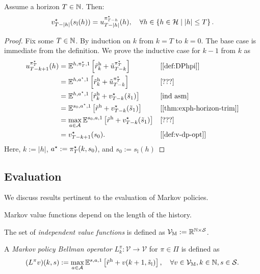 \begin{theorem}
Assume a horizon $T\in \mathbb{N}$. Then:
\[
  v^{\star}_{T-|h|}(s_{\mathrm{l}}(h)) = u^{\pi^{\star}_{T-h}}_{T-|h|}(h), \quad
  \forall h\in \left\{ h\in \mathcal{H} \mid |h| \le T \right\}.
\]
\end{theorem}
\begin{proof}
Fix some $T \in \mathbb{N}$. By induction on $k$ from $k = T$ to $k=0$. The base case is immediate from the definition. We prove the inductive case for $k-1$ from $k$ as
\begin{align*}
u^{\pi\opt_T}_{T-k + 1}(h)
  &=  \E^{h, \pi\opt_T, 1} \left[ \rew_k + \tilde{u}^{\pi\opt_T}_{T-k} \right]
  && \why{\cref{def:DPhpi}} \\
  &=  \E^{h, a\opt, 1} \left[ \rew_k + \tilde{u}^{\pi\opt_T}_{T-k} \right]
  && \why{???} \\
  &=  \E^{h, a\opt, 1} \left[ \rew_{k} + v_{T-k}\opt(\tilde{s}_1) \right]
  && \why{ind asm} \\
  &=  \E^{s_0, a\opt, 1} \left[ \rew +  v_{T-k}\opt(\tilde{s}_1) \right]
  && \why{\cref{thm:exph-horizon-trim}} \\
  &=  \max_{a\in \mathcal{A}} \E^{s_0, a, 1} \left[ \rew +  v_{T-k}\opt(\tilde{s}_1) \right]
  && \why{???} \\
  &=  v_{T-k+1}\opt(s_0). && \why{\cref{def:v-dp-opt}}
\end{align*}
Here, $k := |h|$, $a^{\star} := \pi^{\star}_T(k, s_0)$, and $s_0 := s_{\mathrm{l}}(h)$
\end{proof}

\subsection{Evaluation}
We discuss results pertinent to the evaluation of Markov policies. 

Markov value functions depend on the length of the history.
\begin{definition} \label{def:ValuesM}
  The set of \emph{independent value functions} is defined as $\mathcal{V}_{\mathrm{M}} := \mathbb{R}^{\mathbb{N} \times \mathcal{S}}$.
  \leanok
\end{definition}


\begin{definition}\label{def:DPMopt}
A \emph{Markov policy Bellman operator} $L_k^{\pi}\colon \mathcal{V} \to \mathcal{V}$ for $\pi\in \Pi$ is defined as
\[
(L^{\pi} v)(k, s)  :=
\max_{a\in \mathcal{A}} \mathbb{E}^{s, a, 1} \left[ \tilde{r}^{\mathrm{h}} + v(k + 1, \tilde{s}_{\mathrm{l}}) \right], \quad \forall v\in \mathcal{V}_{\mathrm{M}}, k\in \mathbb{N}, s\in \mathcal{S}.
\]
\leanok
\end{definition}


